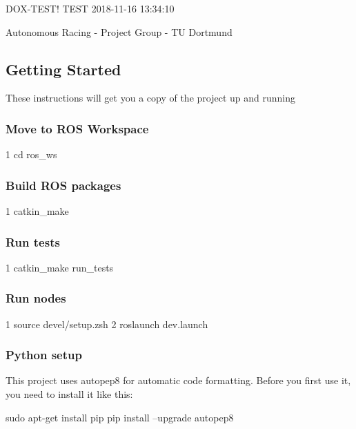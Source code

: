 D\+O\+X-\/\+T\+E\+S\+T! T\+E\+ST 2018-\/11-\/16 13\+:34\+:10

Autonomous Racing -\/ Project Group -\/ TU Dortmund

\href{https://travis-ci.com/Autonomous-Racing-PG/ros.package}{\tt }

\subsection*{Getting Started}

These instructions will get you a copy of the project up and running

\subsubsection*{Move to R\+OS Workspace}


\begin{DoxyCode}
1 cd ros\_ws
\end{DoxyCode}


\subsubsection*{Build R\+OS packages}


\begin{DoxyCode}
1 catkin\_make
\end{DoxyCode}


\subsubsection*{Run tests}


\begin{DoxyCode}
1 catkin\_make run\_tests
\end{DoxyCode}


\subsubsection*{Run nodes}


\begin{DoxyCode}
1 source devel/setup.zsh
2 roslaunch dev.launch
\end{DoxyCode}


\subsubsection*{Python setup}

This project uses {\ttfamily autopep8} for automatic code formatting. Before you first use it, you need to install it like this\+: \begin{DoxyVerb}sudo apt-get install pip
pip install --upgrade autopep8
\end{DoxyVerb}


